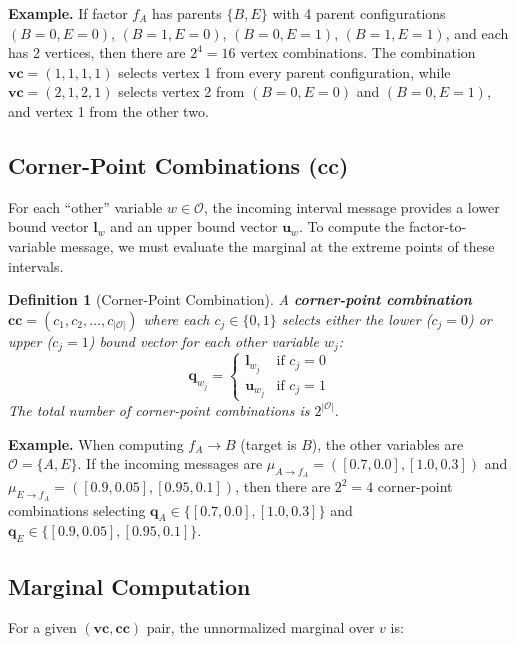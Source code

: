 \documentclass[11pt]{article}
\newtheorem{definition}{Definition}
\begin{document}
\textbf{Example.} If factor $f_A$ has parents $\{B, E\}$ with 4 parent configurations
$(B{=}0,E{=}0)$, $(B{=}1,E{=}0)$, $(B{=}0,E{=}1)$, $(B{=}1,E{=}1)$, and each has
2 vertices, then there are $2^4 = 16$ vertex combinations. The combination $\mathbf{vc} = (1,1,1,1)$
selects vertex 1 from every parent configuration, while $\mathbf{vc} = (2,1,2,1)$ selects vertex 2
from $(B{=}0,E{=}0)$ and $(B{=}0,E{=}1)$, and vertex 1 from the other two.

\subsection{Corner-Point Combinations (cc)}\label{sec:cc}

For each ``other'' variable $w \in \mathcal{O}$, the incoming interval message provides
a lower bound vector $\mathbf{l}_w$ and an upper bound vector $\mathbf{u}_w$. To
compute the factor-to-variable message, we must evaluate the marginal at the extreme
points of these intervals.

\begin{definition}[Corner-Point Combination]
A \textbf{corner-point combination} $\mathbf{cc} = (c_1, c_2, \dots, c_{|\mathcal{O}|})$ where each $c_j \in \{0, 1\}$
selects either the \emph{lower} ($c_j = 0$) or \emph{upper} ($c_j = 1$) bound vector
for each other variable $w_j$:
\[
  \mathbf{q}_{w_j} = \begin{cases}
    \mathbf{l}_{w_j} & \text{if } c_j = 0 \\
    \mathbf{u}_{w_j} & \text{if } c_j = 1
  \end{cases}
\]
The total number of corner-point combinations is $2^{|\mathcal{O}|}$.
\end{definition}

\textbf{Example.} When computing $f_A \to B$ (target is $B$), the other variables are
$\mathcal{O} = \{A, E\}$. If the incoming messages are $\mu_{A \to f_A} = ([0.7, 0.0], [1.0, 0.3])$
and $\mu_{E \to f_A} = ([0.9, 0.05], [0.95, 0.1])$, then there are $2^2 = 4$ corner-point
combinations selecting $\mathbf{q}_A \in \{[0.7, 0.0], [1.0, 0.3]\}$ and
$\mathbf{q}_E \in \{[0.9, 0.05], [0.95, 0.1]\}$.

\subsection{Marginal Computation}

For a given $(\mathbf{vc}, \mathbf{cc})$ pair, the unnormalized marginal over $v$ is:
\end{document}
